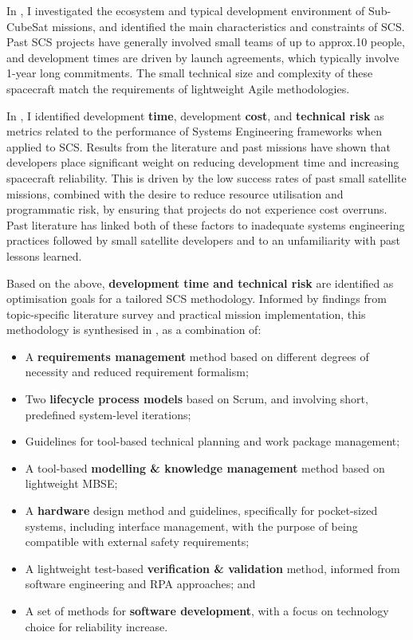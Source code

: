 \documentclass[a4paper,nobib,justified,final]{tufte-book}
\begin{document}
\begin{fullwidth}
\vspace{1.5cm}
In , I investigated the ecosystem and typical development environment of Sub-CubeSat missions, and identified the main characteristics and constraints of \acs{SCS}. Past \acs{SCS} projects have generally involved small teams of up to approx.\@10 people, and development times are driven by launch agreements, which typically involve 1-year long commitments. The small technical size and complexity of these spacecraft match the requirements of lightweight Agile methodologies. 

In , I identified development \textbf{time}, development \textbf{cost}, and \textbf{technical risk} as metrics related to the performance of Systems Engineering frameworks when applied to \acl{SCS}.
Results from the literature and past missions have shown that developers place significant weight on reducing development time and increasing spacecraft reliability. This is driven by the low success rates of past small satellite missions, combined with the desire to reduce resource utilisation and programmatic risk, by ensuring that projects do not experience cost overruns. Past literature has linked both of these factors to inadequate systems engineering practices followed by small satellite developers and to an unfamiliarity with past lessons learned.

Based on the above, \textbf{development time and technical risk} are identified as optimisation goals for a tailored \acs{SCS} methodology. Informed by findings from topic-specific literature survey and practical mission implementation, this methodology is synthesised in , as a combination of:
\begin{itemize}[itemsep=-3pt]
	\item A \textbf{requirements management} method based on different degrees of necessity and reduced requirement formalism;
	\item Two \textbf{lifecycle process models} based on Scrum, and involving short, predefined system-level iterations;
	\item Guidelines for tool-based technical planning and work package management;
	\item A tool-based \textbf{modelling \& knowledge management} method based on lightweight \acl{MBSE};
	\item A \textbf{hardware} design method and guidelines, specifically for pocket-sized systems, including interface management, with the purpose of being compatible with external safety requirements;
	\item A lightweight test-based \textbf{verification \& validation} method, informed from software engineering and \acl{RPA} approaches; and
	\item A set of methods for \textbf{software development}, with a focus on technology choice for reliability increase.
\end{itemize}


\end{fullwidth}
\end{document}
